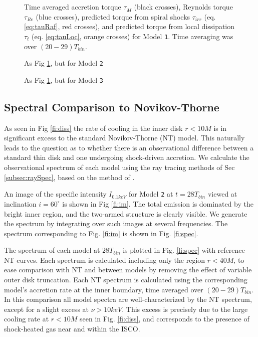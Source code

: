 \documentclass{emulateapj}
\newcommand{\model}[1]{{Model \texttt{#1}}}
\begin{document}
\begin{figure}
	\caption{\label{fi:torque-m2} Time averaged accretion torque $\tau_{\dot{M}}$ (black crosses), Reynolds torque $\tau_{Re}$ (blue crosses), predicted torque from spiral shocks $\tau_{irr}$ (eq. \eqref{eq:tauRaf}, red crosses), and predicted torque from local dissipation $\tau_t$ (eq. \eqref{eq:tauLoc}, orange crosses) for \model{1}. Time averaging was over $(20-29)T_{bin}$.}  
\end{figure}

\begin{figure}
	\caption{\label{fi:torque-m3} As Fig \ref{fi:torque-m2}, but for \model{2}}  
\end{figure}

\begin{figure}
	\caption{\label{fi:torque-m4} As Fig \ref{fi:torque-m2}, but for \model{3}}  
\end{figure}

\subsection{Spectral Comparison to Novikov-Thorne}
\label{subsec:spectra}

As seen in Fig \ref{fi:diss} the rate of cooling in the inner disk $r < 10M$ is in significant excess to the standard Novikov-Thorne (NT) model.  This naturally leads to the question as to whether there is an observational difference between a standard thin disk and one undergoing shock-driven accretion.  We calculate the observational spectrum of each model using the ray tracing methods of Sec \ref{subsec:raySpec}, based on the method of \cite{Kulkarni11}.

\begin{figure*}
	\caption{\label{fi:im} Ray-traced image of \model{2} at $\nu =   1keV$.}
\end{figure*}

An image of the specific intensity $I_{0.1keV}$ for \model{2} at $t=28 T_{bin}$ viewed at inclination $i=60^\circ$ is shown in Fig \ref{fi:im}.  The total emission is dominated by the bright inner region, and the two-armed structure is clearly visible. We generate the spectrum by integrating over such images at several frequencies.  The spectrum corresponding to Fig. \ref{fi:im} is shown in Fig. \ref{fi:spec}. 

The spectrum of each model at $28 T_{bin}$ is plotted in Fig. \ref{fi:spec} with reference NT curves.  Each spectrum is calculated including only the region $r<40M$, to ease comparison with NT and between models by removing the effect of variable outer disk truncation.  Each NT spectrum is calculated using the corresponding model's accretion rate at the inner boundary, time averaged over $(20-29)T_{bin}$.  In this comparison all model spectra are well-characterized by the NT spectrum, except for a slight excess at $\nu > 10keV$.  This excess is precisely due to the large cooling rate at $r<10M$ seen in Fig. \ref{fi:diss}, and corresponds to the presence of shock-heated gas near and within the ISCO.  
\end{document}
